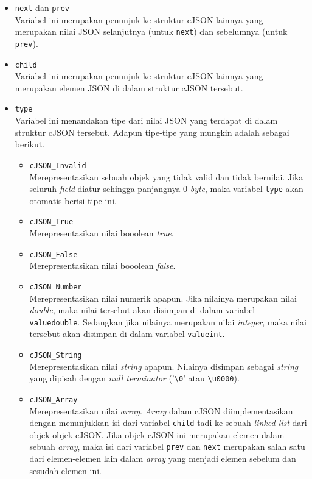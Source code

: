 \begin{itemize}
	\item \verb|next| dan \verb|prev|\\
	Variabel ini merupakan penunjuk ke struktur cJSON lainnya yang merupakan nilai JSON selanjutnya (untuk \verb|next|) dan sebelumnya (untuk \verb|prev|).
	\item \verb|child|\\
	Variabel ini merupakan penunjuk ke struktur cJSON lainnya yang merupakan elemen JSON di dalam struktur cJSON tersebut.
	\item \verb|type|\\
	Variabel ini menandakan tipe dari nilai JSON yang terdapat di dalam struktur cJSON tersebut. Adapun tipe-tipe yang mungkin adalah sebagai berikut.
	
	\begin{itemize}
		\item \verb|cJSON_Invalid|\\
		Merepresentasikan sebuah objek yang tidak valid dan tidak bernilai. Jika seluruh \textit{field} diatur sehingga panjangnya 0 \textit{byte}, maka variabel \verb|type| akan otomatis berisi tipe ini.
		\item \verb|cJSON_True|\\
		Merepresentasikan nilai booolean \textit{true}.
		\item \verb|cJSON_False|\\
		Merepresentasikan nilai booolean \textit{false}.
		\item \verb|cJSON_Number|\\
		Merepresentasikan nilai numerik apapun. Jika nilainya merupakan nilai \textit{double}, maka nilai tersebut akan disimpan di dalam variabel \verb|valuedouble|. Sedangkan jika nilainya merupakan nilai \textit{integer}, maka nilai tersebut akan disimpan di dalam variabel \verb|valueint|.
		\item \verb|cJSON_String|\\
		Merepresentasikan nilai \textit{string} apapun. Nilainya disimpan sebagai \textit{string} yang dipisah dengan \textit{null terminator} ('\verb|\0|' atau \verb|\u0000|).
		\item \verb|cJSON_Array|\\
		Merepresentasikan nilai \textit{array}. \textit{Array} dalam cJSON diimplementasikan dengan menunjukkan isi dari variabel \verb|child| tadi ke sebuah \textit{linked list} dari objek-objek cJSON. Jika objek cJSON ini merupakan elemen dalam sebuah \textit{array}, maka isi dari variabel \verb|prev| dan \verb|next| merupakan salah satu dari elemen-elemen lain dalam \textit{array} yang menjadi elemen sebelum dan sesudah elemen ini.

\end{itemize}
\end{itemize}
